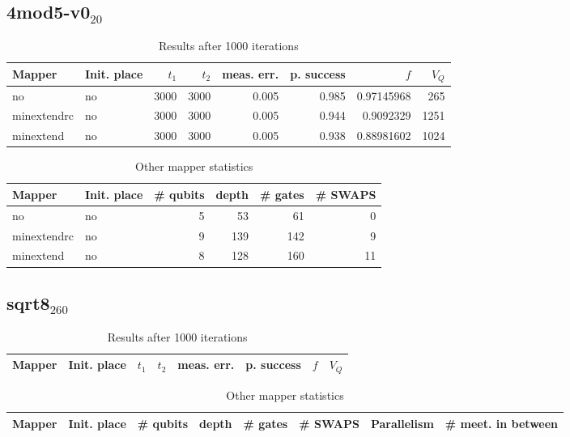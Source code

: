 \documentclass[11pt]{article}
\begin{document}
\subsection{4mod5-v0\(_{\text{20}}\)}
\label{sec:org44292f0}
\begin{table}[!htpb]
\caption{\label{tab:org7b4c98b}
Results after 1000 iterations}
\centering
\begin{tabular}{llrrrrrr}
\hline
Mapper & Init. place & \(t_1\) & \(t_2\) & meas. err. & p. success & \(f\) & \(V_Q\)\\
\hline
no & no & 3000 & 3000 & 0.005 & 0.985 & 0.97145968 & 265\\
\hline
minextendrc & no & 3000 & 3000 & 0.005 & 0.944 & 0.9092329 & 1251\\
minextend & no & 3000 & 3000 & 0.005 & 0.938 & 0.88981602 & 1024\\
\hline
\end{tabular}
\end{table}

\begin{table}[!htpb]
\caption{\label{tab:org33d33ef}
Other mapper statistics}
\centering
\small
\begin{tabular}{llrrrr}
\hline
Mapper & Init. place & \# qubits & depth & \# gates & \# SWAPS\\
\hline
no & no & 5 & 53 & 61 & 0\\
\hline
minextendrc & no & 9 & 139 & 142 & 9\\
minextend & no & 8 & 128 & 160 & 11\\
\hline
\end{tabular}
\end{table}
\subsection{sqrt8\(_{\text{260}}\)}
\label{sec:orgba22bb2}
\begin{table}[!htpb]
\caption{\label{tab:org75962fa}
Results after 1000 iterations}
\centering
\begin{tabular}{llllllll}
\hline
Mapper & Init. place & \(t_1\) & \(t_2\) & meas. err. & p. success & \(f\) & \(V_Q\)\\
\hline
\end{tabular}
\end{table}

\begin{table}[!htpb]
\caption{\label{tab:org01b5b3f}
Other mapper statistics}
\centering
\small
\begin{tabular}{llllllll}
\hline
Mapper & Init. place & \# qubits & depth & \# gates & \# SWAPS & Parallelism & \# meet. in between\\
\hline
\end{tabular}
\end{table}
\end{document}
